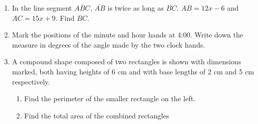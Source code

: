 \begin{enumerate}
\newpage
\item In the line segment $\overline{ABC}$, $\overline{AB}$ is twice as long as $\overline{BC}$. $AB=12x-6$ and $AC=15x+9$. Find $BC$.
\vspace{5cm}

\item Mark the positions of the minute and hour hands at 4:00. Write down the measure in degrees of the angle made by the two clock hands. \par \vspace{0.25cm}

\item A compound shape composed of two rectangles is shown with dimensions marked, both having heights of 6 cm and with base lengths of 2 cm and 5 cm respectively.
  \begin{multicols}{2}
    \begin{enumerate}
      \item Find the perimeter of the smaller rectangle on the left. \vspace{2cm}
      \item Find the total area of the combined rectangles
      \end{enumerate}
    \end{multicols} \vspace{1cm}

\end{enumerate}
